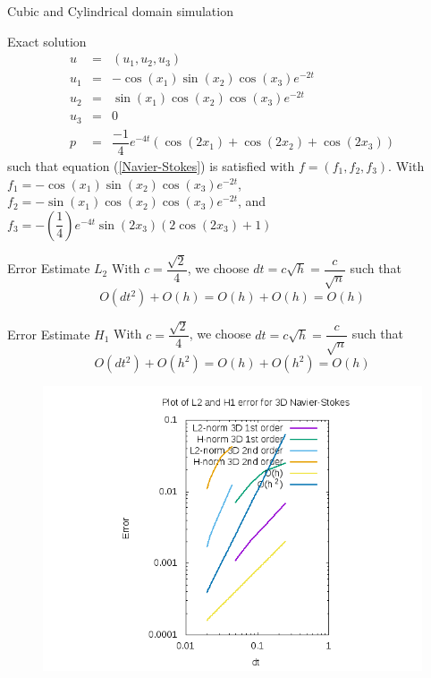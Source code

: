 \documentclass{beamer}
\begin{document}
\begin{frame}{Cubic and Cylindrical domain simulation}
\begin{block}{Exact solution}
		\begin{eqnarray}\nonumber
		u &=& (u_{1},u_{2},u_{3}) \\ \nonumber
		u_{1} &=& -\cos(x_{1}) \sin(x_{2}) \cos(x_3) e^{-2t}\\ \nonumber
		u_{2} &=& \sin(x_{1}) \cos(x_{2}) \cos(x_3) e^{-2t}\\ \nonumber
		u_{3} &=& 0 \\ \nonumber
		p&=& \dfrac{-1}{4} e^{-4t} (\cos(2x_1)+\cos(2x_2)+\cos(2x_3))
		\end{eqnarray}
		such that equation (\ref{Navier-Stokes}) is satisfied with $ f = (f_{1},f_{2},f_3) $. With $ f_{1} = -\cos(x_1) \sin(x_2) \cos(x_3) e^{-2t} $, $ f_{2} = -\sin(x_1) \cos(x_2) \cos(x_3) e^{-2t}  $, and $ f_{3} = -(\dfrac{1}{4})e^{-4t}\sin(2x_3)(2\cos(2x_3)+1)   $
\end{block}
\end{frame}

\begin{frame}
\begin{block}{Error Estimate $ L_{2} $}
	With $ c=\dfrac{\sqrt{2}}{4} $, we choose $ dt = c\sqrt{h} = \dfrac{c}{\sqrt{n}} $ such that
	\[ O(dt^2) + O(h) = O(h) + O(h) = O(h) \]
\end{block}
\begin{block}{Error Estimate $ H_{1} $}
	With $ c=\dfrac{\sqrt{2}}{4} $, we choose $ dt = c\sqrt{h} = \dfrac{c}{\sqrt{n}} $ such that
	\[ O(dt^2) + O(h^2) = O(h) + O(h^2) = O(h) \]
\end{block}
\end{frame}

\begin{frame}
\begin{figure}
	\centering
	\includegraphics[width=1\linewidth]{NS_3D/error_NS_3D}
	\caption{}
	\label{fig:errorns3d}
\end{figure}
\end{frame}
\end{document}
